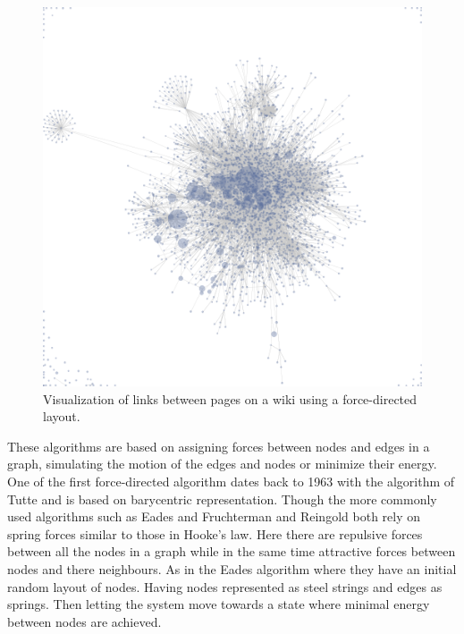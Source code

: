 \documentclass[a4paper,11pt]{kth-mag}
\begin{document}
\begin{figure}[!htbp]
	\centering
	\includegraphics[scale=0.3]{ForceDirectedEx1}
	\caption{Visualization of links between pages on a wiki using a force-directed layout.}
	\label{fig:force_directed_ex1}
\end{figure}

These algorithms are based on assigning forces between nodes and edges in a graph, simulating the motion of the edges and nodes or minimize their energy. One of the first force-directed algorithm dates back to 1963 with 
the algorithm of Tutte\cite{tutteFD} and is based on barycentric representation\cite{1338}. Though the more commonly used algorithms such as Eades\cite{ead} and Fruchterman and Reingold\cite{fr} both rely on spring forces similar to those in
Hooke's law. Here there are repulsive forces between all the nodes in a graph while in the same time attractive forces between nodes and there neighbours. As in the Eades algorithm \cite{1338} where
they have an initial random layout of nodes. Having nodes represented as steel strings and edges as springs. Then letting the system move towards a state where minimal energy between 
nodes are achieved.
\end{document}
